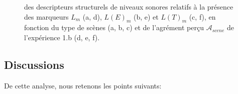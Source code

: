 \documentclass[twoside,twocolumn]{article}
\begin{document}
\begin{figure}[t]
        \caption{  des descripteurs structurels de niveaux sonores relatifs à la présence des marqueurs $L_m$ (a, d), $L(E)_m$ (b, e) et $L(T)_m$ (c, f), en fonction du type de scènes (a, b, c) et de l'agrément perçu $\mathcal{A}_{scene}$ de l'expérience 1.b (d, e, f).}\label{fig:soundlevelMarker}
\end{figure}

\subsection{Discussions}

De cette analyse, nous retenons les points suivants:
\end{document}
